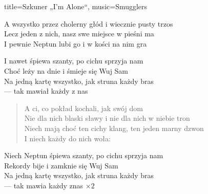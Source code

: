 \begin{song}{title={Szkuner „I'm Alone“}, music={Smugglers}}
\begin{verse*}
        A wszystko przez cholerny głód i wiecznie pusty trzos \\
        Lecz jeden z nich, nasz  swe miejsce w pieśni ma \\
        I pewnie Neptun lubi go i w kości na nim gra
    \end{verse*}
    \begin{chorus}
        I nawet śpiewa szanty, po cichu sprzyja nam \\
        Choć leży na dnie  i śmieje się Wuj Sam \\
        Na jedną kartę wszystko, jak struna każdy bras \\
         --- tak mawiał każdy z nas
    \end{chorus}
    \begin{verse}
        A ci, co pokład  kochali, jak swój dom \\
        Nie dla nich blaski sławy i nie dla nich w niebie tron \\
        Niech mają choć ten cichy klang, ten jeden marny dzwon \\
        I niech każdy do nich woła: 
    \end{verse}
    \begin{chorus}
        Niech Neptun śpiewa szanty, po cichu sprzyja nam \\
        Rekordy bije  i zamknie się Wuj Sam \\
        Na jedną kartę wszystko, jak struna każdy bras \\
         --- tak mawia każdy znas $\times 2$
    \end{chorus}
    \begin{outro}
          
    \end{outro}
\end{song}

